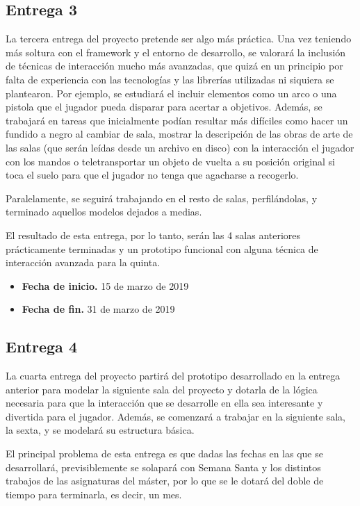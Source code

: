 \subsection{Entrega 3}

La tercera entrega del proyecto pretende ser algo más práctica. Una vez teniendo más soltura con el framework y el entorno de desarrollo, se valorará la inclusión de técnicas de interacción mucho más avanzadas, que quizá en un principio por falta de experiencia con las tecnologías y las librerías utilizadas ni siquiera se plantearon. Por ejemplo, se estudiará el incluir elementos como un arco o una pistola que el jugador pueda disparar para acertar a objetivos. Además, se trabajará en tareas que inicialmente podían resultar más difíciles como hacer un fundido a negro al cambiar de sala, mostrar la descripción de las obras de arte de las salas (que serán leídas desde un archivo en disco) con la interacción el jugador con los mandos o teletransportar un objeto de vuelta a su posición original si toca el suelo para que el jugador no tenga que agacharse a recogerlo.

Paralelamente, se seguirá trabajando en el resto de salas, perfilándolas, y terminado aquellos modelos dejados a medias.

El resultado de esta entrega, por lo tanto, serán las 4 salas anteriores prácticamente terminadas y un prototipo funcional con alguna técnica de interacción avanzada para la quinta.

\begin{itemize}
    \item \textbf{Fecha de inicio.} 15 de marzo de 2019
    \item \textbf{Fecha de fin.} 31 de marzo de 2019
\end{itemize}

\subsection{Entrega 4}

La cuarta entrega del proyecto partirá del prototipo desarrollado en la entrega anterior para modelar la siguiente sala del proyecto y dotarla de la lógica necesaria para que la interacción que se desarrolle en ella sea interesante y divertida para el jugador. Además, se comenzará a trabajar en la siguiente sala, la sexta, y se modelará su estructura básica.

El principal problema de esta entrega es que dadas las fechas en las que se desarrollará, previsiblemente se solapará con Semana Santa y los distintos trabajos de las asignaturas del máster, por lo que se le dotará del doble de tiempo para terminarla, es decir, un mes.

